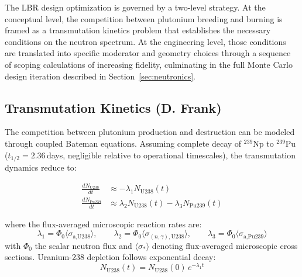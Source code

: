 
The LBR design optimization is governed by a two-level strategy. At the conceptual level, the competition between plutonium breeding and burning is framed as a transmutation kinetics problem that establishes the necessary conditions on the neutron spectrum. At the engineering level, those conditions are translated into specific moderator and geometry choices through a sequence of scoping calculations of increasing fidelity, culminating in the full Monte Carlo design iteration described in Section~\ref{sec:neutronics}.

\subsection{Transmutation Kinetics (D. Frank)}
\label{sec:transmutation-kinetics}

The competition between plutonium production and destruction can be modeled through coupled Bateman equations. Assuming complete decay of $^{239}$Np to $^{239}$Pu ($t_{1/2} = 2.36$\,days, negligible relative to operational timescales), the transmutation dynamics reduce to:

\begin{align}
    \frac{dN_\text{U238}}{dt}  &\approx -\lambda_1 N_\text{U238}(t) \label{eq:U238-ode} \\
    \frac{dN_\text{Pu239}}{dt} &\approx \lambda_2 N_\text{U238}(t) - \lambda_3 N_\text{Pu239}(t) \label{eq:Pu239-ode}
\end{align}

\noindent where the flux-averaged microscopic reaction rates are:
\begin{equation}
    \lambda_1 = \Phi_0 \langle \sigma_\text{a,U238} \rangle, \qquad
    \lambda_2 = \Phi_0 \langle \sigma_{(n,\gamma),\text{U238}} \rangle, \qquad
    \lambda_3 = \Phi_0 \langle \sigma_\text{a,Pu239} \rangle
\end{equation}
with $\Phi_0$ the scalar neutron flux and $\langle \sigma_* \rangle$ denoting flux-averaged microscopic cross sections. Uranium-238 depletion follows exponential decay:
\begin{equation}
    N_\text{U238}(t) = N_\text{U238}(0)\,e^{-\lambda_1 t}
\end{equation}


